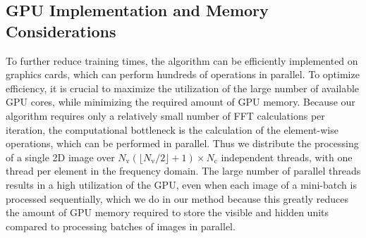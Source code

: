 \subsection{GPU Implementation and Memory Considerations}

To further reduce training times, the algorithm can be efficiently implemented
on graphics cards, which can perform hundreds of operations in parallel.
To optimize efficiency, it is crucial to maximize the utilization of the large
number of available GPU cores, while minimizing the required amount of GPU
memory. Because our algorithm requires only a relatively small number of FFT
calculations per iteration, the computational bottleneck is the calculation of
the element-wise operations, which can be performed in parallel. Thus we
distribute the processing of a single 2D image over $N_\text{v}(\lfloor
N_\text{v}/2 \rfloor + 1) \times N_\text{c}$ independent threads, with one
thread per element in the frequency domain. The large number of parallel threads
results in a high utilization of the GPU, even when each image of a mini-batch
is processed sequentially, which we do in our method because this greatly
reduces the amount of GPU memory required to store the visible and hidden units
compared to processing batches of images in parallel.

